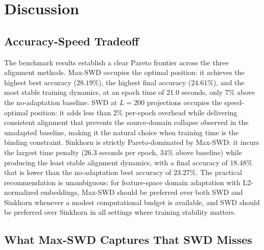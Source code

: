 \documentclass{article}
\begin{document}
	
	
	
	
	\section{Discussion}
	
	\subsection{Accuracy-Speed Tradeoff}
	
	The benchmark results establish a clear Pareto frontier across the three alignment methods. Max-SWD occupies the optimal position: it achieves the highest best accuracy ($28.19\%$), the highest final accuracy ($24.61\%$), and the most stable training dynamics, at an epoch time of $21.0$ seconds, only $7\%$ above the no-adaptation baseline. SWD at $L = 200$ projections occupies the speed-optimal position: it adds less than $2\%$ per-epoch overhead while delivering consistent alignment that prevents the source-domain collapse observed in the unadapted baseline, making it the natural choice when training time is the binding constraint. Sinkhorn is strictly Pareto-dominated by Max-SWD: it incurs the largest time penalty ($26.3$ seconds per epoch, $34\%$ above baseline) while producing the least stable alignment dynamics, with a final accuracy of $18.48\%$ that is lower than the no-adaptation best accuracy of $23.27\%$. The practical recommendation is unambiguous: for feature-space domain adaptation with L2-normalized embeddings, Max-SWD should be preferred over both SWD and Sinkhorn whenever a modest computational budget is available, and SWD should be preferred over Sinkhorn in all settings where training stability matters.
	
	
	\subsection{What Max-SWD Captures That SWD Misses}
	
\end{document}
